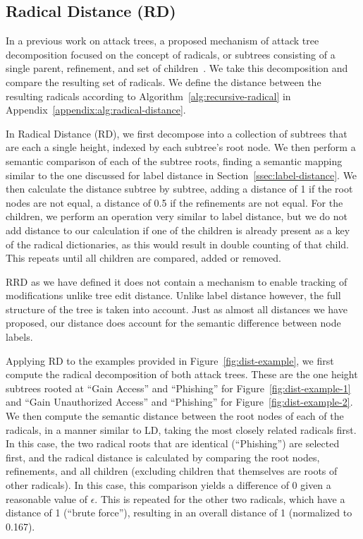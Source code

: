 \subsection{Radical Distance (RD)}
\label{ssec:rd}

In a previous work on attack trees, a proposed mechanism of attack tree decomposition focused on the concept of radicals, or subtrees consisting of a single parent, refinement, and set of children~\cite{schiele2021novel}. We take this decomposition and compare the resulting set of radicals. We define the distance between the resulting radicals according to Algorithm~\ref{alg:recursive-radical} in Appendix~\ref{appendix:alg:radical-distance}.

In Radical Distance (RD), we first decompose into a collection of subtrees that are each a single height, indexed by each subtree's root node. We then perform a semantic comparison of each of the subtree roots, finding a semantic mapping similar to the one discussed for label distance in Section~\ref{ssec:label-distance}. We then calculate the distance subtree by subtree, adding a distance of 1 if the root nodes are not equal, a distance of 0.5 if the refinements are not equal. For the children, we perform an operation very similar to label distance, but we do not add distance to our calculation if one of the children is already present as a key of the radical dictionaries, as this would result in double counting of that child. This repeats until all children are compared, added or removed.

RRD as we have defined it does not contain a mechanism to enable tracking of modifications unlike tree edit distance. Unlike label distance however, the full structure of the tree is taken into account. Just as almost all distances we have proposed, our distance does account for the semantic difference between node labels.

Applying RD to the examples provided in Figure~\ref{fig:dist-example}, we first compute the radical decomposition of both attack trees. These are the one height subtrees rooted at ``Gain Access'' and ``Phishing'' for Figure~\ref{fig:dist-example-1} and ``Gain Unauthorized Access'' and ``Phishing'' for Figure~\ref{fig:dist-example-2}. We then compute the semantic distance between the root nodes of each of the radicals, in a manner similar to LD, taking the most closely related radicals first. In this case, the two radical roots that are identical (``Phishing'') are selected first, and the radical distance is calculated by comparing the root nodes, refinements, and all children (excluding children that themselves are roots of other radicals). In this case, this comparison yields a difference of 0 given a reasonable value of $\epsilon$. This is repeated for the other two radicals, which have a distance of 1 (``brute force''), resulting in an overall distance of 1 (normalized to 0.167).


